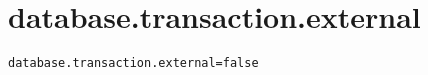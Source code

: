 \section{database.transaction.external}
\label{configuration:DatabaseTransactionExternal}
\AvailableInJavaOnly{\TODO}
\begin{lstlisting}[style=Props,caption={Usage example for \textit{database.transaction.external}}]
database.transaction.external=false
\end{lstlisting}